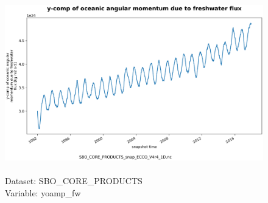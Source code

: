 \begin{figure}[H]
\centering
\includegraphics[scale=0.5]{../images/plots/oneD_plots/SBO_Core_Products/yoamp_fw.png}
\caption{\\Dataset: SBO\_CORE\_PRODUCTS\\Variable: yoamp\_fw}
\label{tab:table-SBO_CORE_PRODUCTS_yoamp_fw-Plot}
\end{figure}
\pagebreak
